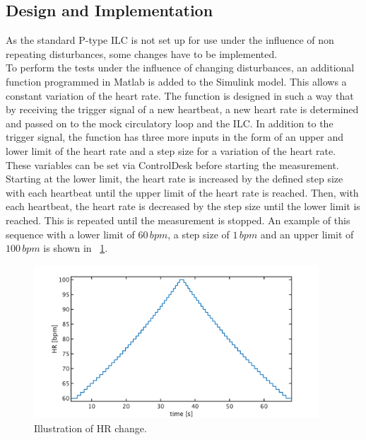 \subsection{Design and Implementation}
As the standard P-type ILC is not set up for use under the influence of non repeating disturbances, some changes have to be implemented.
\\To perform the tests under the influence of changing disturbances, an additional function programmed in Matlab is added to the Simulink model. This allows a constant variation of the heart rate. The function is designed in such a way that by receiving the trigger signal of a new heartbeat, a new heart rate is determined and passed on to the mock circulatory loop and the ILC. In addition to the trigger signal, the function has three more inputs in the form of an upper and lower limit of the heart rate and a step size for a variation of the heart rate. These variables can be set via ControlDesk before starting the measurement.
Starting at the lower limit, the heart rate is increased by the defined step size with each heartbeat until the upper limit of the heart rate is reached. Then, with each heartbeat, the heart rate is decreased by the step size until the lower limit is reached. This is repeated until the measurement is stopped. An example of this sequence with a lower limit of $60\, bpm$, a step size of $1\, bpm$ and an upper limit of $100\, bpm$ is shown in \figurename~\ref{fig:hr_increase}.
\begin{figure}[ht!]
  \centering
  \includegraphics[width=0.95\textwidth]{images/chapt_5/ILC/hr_increase.pdf}
  \caption[Illustration of HR change]{Illustration of HR change.}
  \label{fig:hr_increase}
\end{figure}

